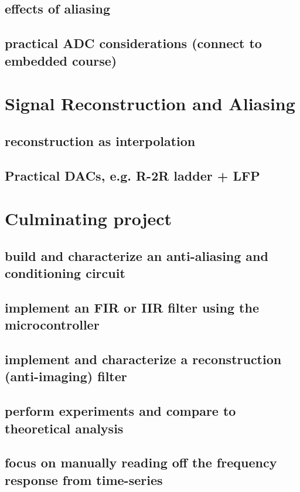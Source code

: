 \documentclass{article}
\begin{document}
\subsection{effects of aliasing}
\label{sec:org6646e99}

\subsection{practical ADC considerations (connect to embedded course)}
\label{sec:org392e289}

\newpage
\section{Signal Reconstruction and Aliasing}
\label{sec:orgd8bc19e}

\subsection{reconstruction as interpolation}
\label{sec:org611b884}

\subsection{Practical DACs, e.g. R-2R ladder + LFP}
\label{sec:org453776d}

\newpage
\section{Culminating project}
\label{sec:orgc32fcee}

\subsection{build and characterize an anti-aliasing and conditioning circuit}
\label{sec:org9327da8}

\subsection{implement an FIR or IIR filter using the microcontroller}
\label{sec:org1a5c706}

\subsection{implement and characterize a reconstruction (anti-imaging) filter}
\label{sec:orgdf52bce}

\subsection{perform experiments and compare to theoretical analysis}
\label{sec:org09205ed}

\subsection{focus on manually reading off the frequency response from time-series}
\label{sec:orge9e1795}
\end{document}
